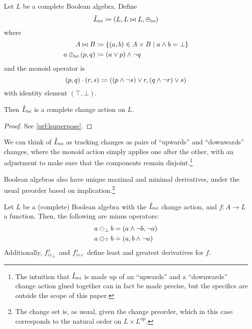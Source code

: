 \begin{prop}[name=Boolean algebra change actions, restate=lsuperpose]
 Let $L$ be a complete Boolean algebra. Define
  \begin{displaymath}
    \hat{L}_{\bowtie} \coloneqq (L,L \bowtie L,\oplus_{\bowtie})
  \end{displaymath}
  where
  \begin{align*}
    A \bowtie B &\coloneqq \{ (a, b) \in A \times B \mid a \wedge b = \bot \}\\
    a \oplus_{\bowtie} (p, q) &\coloneqq (a \vee p) \wedge \neg q
  \end{align*}
  and the monoid operator is
  \begin{displaymath}
    (p, q) \cdot (r, s) \coloneqq ((p \wedge \neg s) \vee r, (q \wedge \neg r) \vee s)
  \end{displaymath}
  with identity element $(\top, \bot)$.

  Then $\hat{L}_{\bowtie}$ is a complete change action on $L$.
\end{prop}
\ifproofs
\begin{proof}
  See \cref{prf:lsuperpose}.
\end{proof}
\fi

We can think of $\hat{L}_{\bowtie}$ as tracking changes as pairs of ``upwards'' and
``downwards'' changes, where the monoid action simply applies one after the
other, with an adjustment to make sure that the components remain disjoint.\footnote{
  The intuition that $\hat{L}_{\bowtie}$ is made up of an ``upwards''
  and a ``downwards'' change action glued together can in fact be made precise, but the specifics
  are outside the scope of this paper.}

Boolean algebras also have unique maximal and minimal
derivatives, under the usual preorder based on implication.\footnote{The change
set is, as usual, given the change preorder, which in this case corresponds to
the natural order on $L \times L^{\textrm{op}}$.}

\begin{prop}
  \label{prop:minimalMaximalDerivatives}
  Let $L$ be a (complete) Boolean algebra with the $\hat{L}_{\bowtie}$ change action, and
  $f: A \rightarrow L$ a function.
  Then, the following are minus operators:
  \begin{align*}
    a \ominus_\bot b &= (a \wedge \neg b, \neg a)\\
    a \ominus_\top b &= (a, b \wedge \neg a)
  \end{align*}
  Additionally, $f'_{\ominus_{\bot}}$ and $f'_{\ominus_{\top}}$ 
  define least and greatest derivatives for $f$.
\end{prop}

